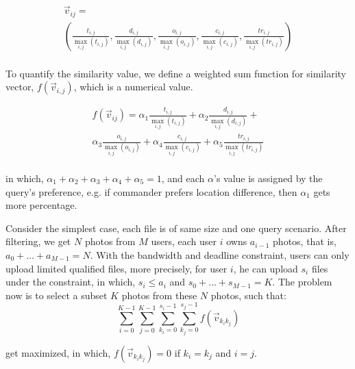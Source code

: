  \begin{equation}
\begin{array}{l}
 {\overrightarrow{v}_{ij}} =  \\
 \left( {\frac{{{t_{i,j}}}}{{\mathop {\max }\limits_{i,j} \left( {{t_{i,j}}} \right)}},\frac{{{d_{i,j}}}}{{\mathop {\max }\limits_{i,j} \left( {{d_{i,j}}} \right)}},\frac{{{o_{i,j}}}}{{\mathop {\max }\limits_{i,j} \left( {{o_{i,j}}} \right)}},\frac{{{c_{i,j}}}}{{\mathop {\max }\limits_{i,j} \left( {{c_{i,j}}} \right)}},\frac{{t{r_{i,j}}}}{{\mathop {\max }\limits_{i,j} \left( {t{r_{i,j}}} \right)}}} \right) \\
 \end{array}
 \end{equation}



To quantify the similarity value, we define a weighted sum function for similarity vector, $f(\overrightarrow{v}_{i,j})$, which is a numerical value.

\begin{equation}
\begin{array}{l}
 f\left( {{\overrightarrow{v}_{ij}}} \right) = {\alpha _1}\frac{{{t_{i,j}}}}{{\mathop {\max }\limits_{i,j} \left( {{t_{i,j}}} \right)}} + {\alpha _2}\frac{{{d_{i,j}}}}{{\mathop {\max }\limits_{i,j} \left( {{d_{i,j}}} \right)}} +  \\
 {\alpha _3}\frac{{{o_{i,j}}}}{{\mathop {\max }\limits_{i,j} \left( {{o_{i,j}}} \right)}} + {\alpha _4}\frac{{{c_{i,j}}}}{{\mathop {\max }\limits_{i,j} \left( {{c_{i,j}}} \right)}} + {\alpha _5}\frac{{t{r_{i,j}}}}{{\mathop {\max }\limits_{i,j} \left( {t{r_{i,j}}} \right)}} \\
 \end{array}
\end{equation}

in which, $\alpha_{1}+\alpha_{2}+\alpha_{3}+\alpha_{4}+\alpha_{5}=1$, and each $\alpha$'s value is assigned by the query's preference, e.g. if commander prefers location difference, then $\alpha_{1}$ gets more percentage.

Consider the simplest case, each file is of same size and one query scenario. After filtering, we get $N$ photos from $M$ users, each user $i$ owns $a_{i-1}$ photos, that is, $a_{0}+\ldots+a_{M-1}=N$. With the bandwidth and deadline constraint, users can only upload limited qualified files, more precisely, for user $i$, he can upload $s_{i}$ files under the constraint, in which, $s_{i}\leq a_{i}$ and $s_{0}+\ldots+s_{M-1}=K$. The problem now is to select a subset $K$ photos from these $N$ photos, such that:
\begin{equation}
\sum\limits_{i = 0}^{K - 1} {\sum\limits_{j = 0}^{K - 1} {\sum\limits_{{k_i} = 0}^{{s_i} - 1} {\sum\limits_{{k_j} = 0}^{{s_j} - 1} {f\left( {{{\vec v}_{{k_i}{k_j}}}} \right)} } } }
 \end{equation}

 get maximized, in which, $f(\overrightarrow{v}_{k_{i}k_{j}})=0$ if $k_{i}=k_{j}$ and $i=j$. 